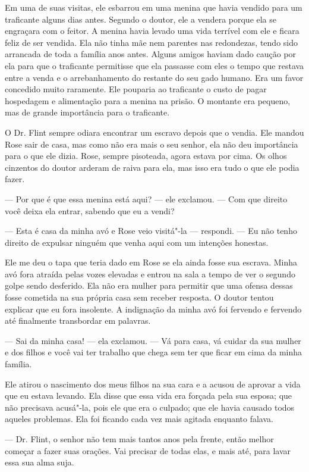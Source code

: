 Em uma de suas visitas, ele esbarrou em
uma menina que havia vendido para um traficante alguns dias antes.
Segundo o doutor, ele a vendera porque ela se engraçara com o feitor. A
menina havia levado uma vida terrível com ele e ficara feliz de ser
vendida. Ela não tinha mãe nem parentes nas redondezas, tendo sido
arrancada de toda a família anos antes. Alguns amigos haviam dado caução
por ela para que o traficante permitisse que ela passasse com eles o
tempo que restava entre a venda e o arrebanhamento do restante do seu
gado humano. Era um favor concedido muito raramente. Ele pouparia ao
traficante o custo de pagar hospedagem e alimentação para a menina na
prisão. O montante era pequeno, mas de grande importância para o
traficante.

O Dr. Flint sempre odiara encontrar um
escravo depois que o vendia. Ele mandou Rose sair de casa, mas como não
era mais o seu senhor, ela não deu importância para o que ele dizia.
Rose, sempre pisoteada, agora estava por cima. Os olhos cinzentos do
doutor arderam de raiva para ela, mas isso era tudo o que ele podia
fazer.

--- Por que é que essa menina está aqui? --- ele exclamou. --- Com que
direito você deixa ela entrar, sabendo que eu a vendi?

--- Esta é casa da minha avó e Rose
veio visitá"-la --- respondi. --- Eu não tenho direito de expulsar
ninguém que venha aqui com um intenções honestas.

Ele me deu o tapa que teria dado em
Rose se ela ainda fosse sua escrava. Minha avó fora atraída pelas vozes
elevadas e entrou na sala a tempo de ver o segundo golpe sendo
desferido. Ela não era mulher para permitir que uma ofensa dessas fosse
cometida na sua própria casa sem receber resposta. O doutor tentou
explicar que eu fora insolente. A indignação da minha avó foi fervendo e
fervendo até finalmente transbordar em palavras.

--- Sai da minha casa! --- ela exclamou. --- Vá para casa, vá cuidar da
sua mulher e dos filhos e você vai ter trabalho que chega sem ter que
ficar em cima da minha família.

Ele atirou o nascimento dos meus filhos
na sua cara e a acusou de aprovar a vida que eu estava levando. Ela
disse que essa vida era forçada pela sua esposa; que não precisava
acusá"-la, pois ele que era o culpado; que ele havia causado todos
aqueles problemas. Ela foi ficando cada vez mais agitada enquanto
falava.

--- Dr. Flint, o senhor não tem mais tantos anos pela frente, então
melhor começar a fazer suas orações. Vai precisar de todas elas, e mais
até, para lavar essa sua alma suja.

